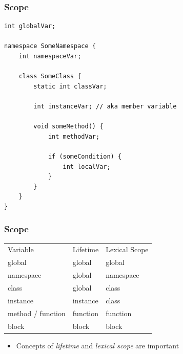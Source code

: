 \documentclass[table]{beamer}
\newcommand{\declarelesson}{\textbf{\color{themegreen}{Lesson:}} }
\begin{document}

\begin{frame}[fragile]
    \frametitle{\declarelesson Scope}
    \begin{lstlisting}[basicstyle=\scriptsize\ttfamily\color{codefg}]
int globalVar;

namespace SomeNamespace {
    int namespaceVar;

    class SomeClass {
        static int classVar;

        int instanceVar; // aka member variable

        void someMethod() {
            int methodVar;

            if (someCondition) {
                int localVar;
            }
        }
    }
}
    \end{lstlisting}
\end{frame}

\begin{frame}
    \frametitle{\declarelesson Scope}

    \begin{table}[tl]
        \begin{tabular}{p{3cm}p{2.5cm}p{2.5cm}}
            \rowcolor{codebg}
            \color{white} Variable & \color{white} Lifetime & \color{white} Lexical Scope\\
                          global & global & global \\
                       namespace & global & namespace \\
                        class & global & class \\
                     instance & instance & class \\
                     method / function & function & function \\
                     block & block & block \\
        \end{tabular}
    \end{table}
    \begin{itemize}
        \item Concepts of \emph{lifetime} and \emph{lexical scope} are important
    \end{itemize}
\end{frame}
\end{document}
